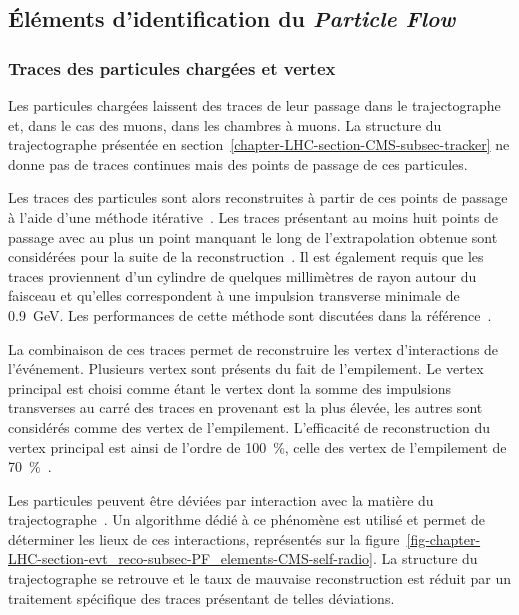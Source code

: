 \subsection{Éléments d'identification du \emph{Particle Flow}}\label{chapter-LHC-section-evt_reco-subsec-PF_elements}
\subsubsection{Traces des particules chargées et vertex}\label{chapter-LHC-section-evt_reco-subsec-PF_elements-subsubsec-tracks}
Les particules chargées laissent des traces de leur passage dans le trajectographe et, dans le cas des muons, dans les chambres à muons.
La structure du trajectographe présentée en section~\ref{chapter-LHC-section-CMS-subsec-tracker} ne donne pas de traces continues mais des points de passage de ces particules.
\par Les traces des particules sont alors reconstruites à partir de ces points de passage à l'aide d'une méthode itérative~\cite{track_reco}.
Les traces présentant au moins huit points de passage avec au plus un point manquant le long de l'extrapolation obtenue sont considérées pour la suite de la reconstruction~\cite{particle-flow}.
Il est également requis que les traces proviennent d'un cylindre de quelques millimètres de rayon autour du faisceau et qu'elles correspondent à une impulsion transverse minimale de \SI{0.9}{\GeV}.
Les performances de cette méthode sont discutées dans la référence~\cite{CMS_TDR_1}.
\par La combinaison de ces traces permet de reconstruire les vertex d'interactions de l'événement.
Plusieurs vertex sont présents du fait de l'empilement.
Le vertex principal est choisi comme étant le vertex dont la somme des impulsions transverses au carré des traces en provenant est la plus élevée, les autres sont considérés comme des vertex de l'empilement.
L'efficacité de reconstruction du vertex principal est ainsi de l'ordre de \SI{100}{\%}, celle des vertex de l'empilement de \SI{70}{\%}~\cite{JERC_RunI}.
\par Les particules peuvent être déviées par interaction avec la matière du trajectographe~\cite{moliere_scat_1,moliere_scat_2}.
Un algorithme dédié à ce phénomène est utilisé et permet de déterminer les lieux de ces interactions, représentés sur la figure~\ref{fig-chapter-LHC-section-evt_reco-subsec-PF_elements-CMS-self-radio}.
La structure du trajectographe se retrouve et le taux de mauvaise reconstruction est réduit par un traitement spécifique des traces présentant de telles déviations.
